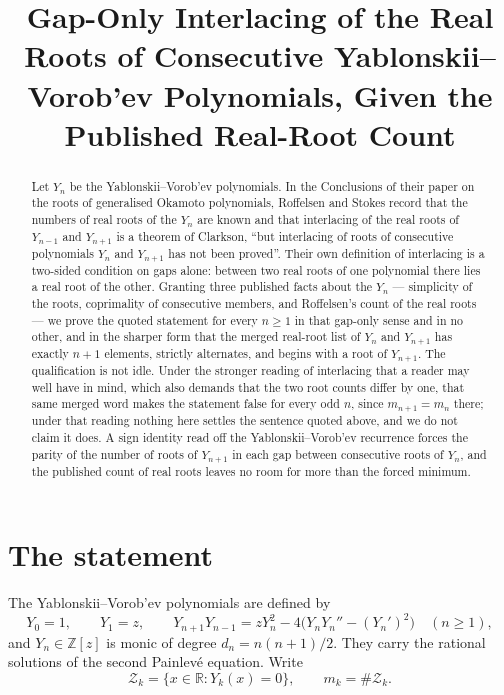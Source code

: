 \documentclass[11pt]{amsart}
\title[Gap-only interlacing of $Y_n$ and $Y_{n+1}$]
{Gap-Only Interlacing of the Real Roots of Consecutive Yablonskii--Vorob'ev
Polynomials, Given the Published Real-Root Count}
\date{}
\theoremstyle{definition}
\newcommand{\Zs}{\mathcal Z}
\begin{document}
\begin{abstract}
Let $Y_n$ be the Yablonskii--Vorob'ev polynomials. In the Conclusions of their
paper on the roots of generalised Okamoto polynomials, Roffelsen and Stokes
record that the numbers of real roots of the $Y_n$ are known and that
interlacing of the real roots of $Y_{n-1}$ and $Y_{n+1}$ is a theorem of
Clarkson, ``but interlacing of roots of consecutive polynomials $Y_n$ and
$Y_{n+1}$ has not been proved''. Their own definition of interlacing is a
two-sided condition on gaps alone: between two real roots of one polynomial
there lies a real root of the other. Granting three published facts about the
$Y_n$ --- simplicity of the roots, coprimality of consecutive members, and
Roffelsen's count of the real roots --- we prove the quoted statement for every
$n\ge1$ in that gap-only sense and in no other, and in the sharper form that the
merged real-root list of $Y_n$ and $Y_{n+1}$ has exactly $n+1$ elements,
strictly alternates, and begins with a root of $Y_{n+1}$. The qualification is
not idle. Under the stronger reading of interlacing that a reader may well have
in mind, which also demands that the two root counts differ by one, that same
merged word makes the
statement false for every odd $n$, since $m_{n+1}=m_n$ there; under that reading
nothing here settles the sentence quoted above, and we do not claim it does. A
sign identity read
off the Yablonskii--Vorob'ev recurrence forces the parity of the number of roots
of $Y_{n+1}$ in each gap between consecutive roots of $Y_n$, and the published
count of real roots leaves no room for more than the forced minimum.
\end{abstract}

\maketitle

\section{The statement}

The Yablonskii--Vorob'ev polynomials are defined by
\begin{equation}\label{eq:rec}
 Y_0=1,\qquad Y_1=z,\qquad
 Y_{n+1}Y_{n-1}=zY_n^2-4\bigl(Y_nY_n''-(Y_n')^2\bigr)\quad(n\ge1),
\end{equation}
and $Y_n\in\mathbb Z[z]$ is monic of degree $d_n=n(n+1)/2$. They carry the
rational solutions of the second Painlev\'e equation. Write
\[
 \Zs_k=\{x\in\mathbb R: Y_k(x)=0\},\qquad m_k=\#\Zs_k .
\]
\end{document}
